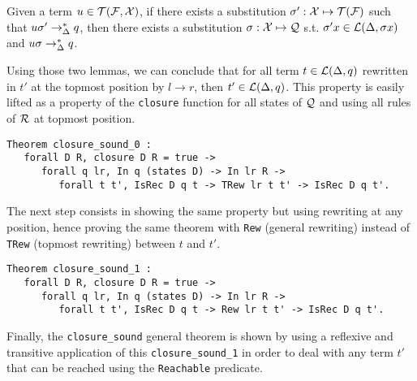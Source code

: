\begin{lemma}
\label{lem:tftoq}
Given a term $u \in \mathcal{T}(\mathcal{F}, {\cal X})$, if there exists a substitution $\sigma':{\cal X}
\mapsto {\cal T(F)}$ such that $u\sigma' \rightarrow_{\Delta}^* q$, then there exists a
substitution $\sigma:{\cal X}\mapsto \mathcal{Q}$ s.t. $\sigma' x \in {\cal L}(\Delta, \sigma x)$
and $u\sigma\rightarrow^*_{\Delta} q$.
\end{lemma}

Using those two lemmas, we can conclude that for all term $t\in{\cal L}(\Delta,q)$
rewritten in $t'$ at the topmost position by $l \rightarrow r$, then $t' \in
{\cal L}(\Delta, q)$. This property is easily lifted as a property of the
\lstinline!closure! function for all states of $\mathcal{Q}$ and using all rules of $\mathcal{R}$
at topmost position.

\begin{lstlisting}
Theorem closure_sound_0 : 
   forall D R, closure D R = true ->
      forall q lr, In q (states D) -> In lr R ->
         forall t t', IsRec D q t -> TRew lr t t' -> IsRec D q t'.
\end{lstlisting}
The next step consists in showing the same property but using rewriting at any
position, hence proving the same theorem with \lstinline!Rew! (general
rewriting) instead of \lstinline!TRew! (topmost rewriting) between
$t$ and $t'$.

\begin{lstlisting}
Theorem closure_sound_1 : 
   forall D R, closure D R = true ->
      forall q lr, In q (states D) -> In lr R ->
         forall t t', IsRec D q t -> Rew lr t t' -> IsRec D q t'.
\end{lstlisting}
Finally, the \lstinline!closure_sound! general theorem is 
shown by using a reflexive and transitive application of this
\lstinline!closure_sound_1! in order to deal with any term $t'$ that can be
reached using the \lstinline!Reachable! predicate.


